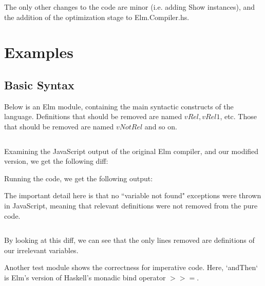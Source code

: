 \documentclass{article}
\begin{document}
The only other changes to the code are minor (i.e. adding Show instances), and the addition of the optimization stage to Elm.Compiler.hs.

\section{Examples}

\subsection{Basic Syntax}

Below is an Elm module, containing the main syntactic constructs of the language.
Definitions that should be removed are named $vRel, vRel1$, etc. Those that should be removed are named
$vNotRel$ and so on.

\inputminted{elm}{apaTests/SyntaxTest.elm}

Examining the JavaScript output of the original Elm compiler, and our modified version,
we get the following diff:

Running the code, we get the following output:


The important detail here is that no ``variable not found" exceptions
were thrown in JavaScript, meaning that relevant definitions were not removed
from the pure code.



\inputminted{diff}{apaTests/SyntaxTest.diff}

By looking at this diff, we can see that the only lines removed are definitions of our irrelevant variables.

Another test module shows the correctness for imperative code. Here, `andThen` is Elm's version
of Haskell's monadic bind operator $>>=$.

\inputminted{elm}{apaTests/ImperativeTest.elm}          

                    
\end{document}
